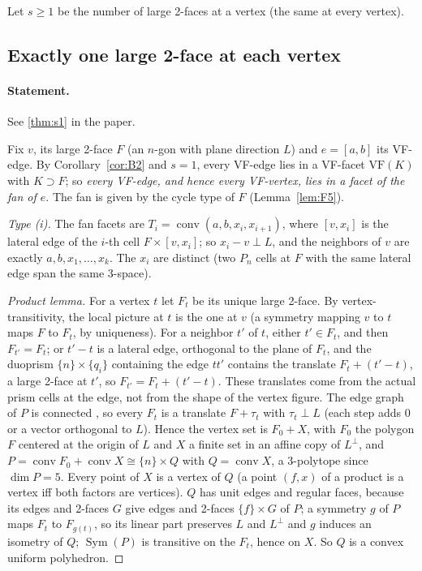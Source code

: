 \documentclass[11pt]{article}
\theoremstyle{definition}
\theoremstyle{remark}
\newcommand{\VF}{\mathrm{VF}}
\newcommand{\conv}{\operatorname{conv}}
\newcommand{\Sym}{\operatorname{Sym}}
\begin{document}
Let $s\ge1$ be the number of large 2-faces at a vertex (the same at every
vertex).

\subsection{Exactly one large 2-face at each vertex}\label{sec:s1}

\paragraph{Statement.} See \ref{thm:s1} in the paper.


Fix $v$, its large 2-face $F$ (an $n$-gon with plane direction $L$) and
$e=[a,b]$ its VF-edge. By Corollary~\ref{cor:B2} and $s=1$, every VF-edge
lies in a VF-facet $\VF(K)$ with $K\supset F$; so \emph{every VF-edge, and
hence every VF-vertex, lies in a facet of the fan of $e$}. The fan is
given by the cycle type of $F$ (Lemma~\ref{lem:F5}).

\begin{proof}[Type (i)]
The fan facets are $T_i=\conv(a,b,x_i,x_{i+1})$, where $[v,x_i]$ is the
lateral edge of the $i$-th cell $F\times[v,x_i]$; so $x_i-v\perp L$, and the
neighbors of $v$ are exactly $a,b,x_1,\dots,x_k$. The $x_i$ are distinct
(two $P_n$ cells at $F$ with the same lateral edge span the same 3-space).

\emph{Product lemma.} For a vertex $t$ let $F_t$ be its unique large
2-face. By vertex-transitivity, the local picture at $t$ is the one at
$v$ (a symmetry mapping $v$ to $t$ maps $F$ to $F_t$, by uniqueness). For a
neighbor $t'$ of $t$, either $t'\in F_t$, and then $F_{t'}=F_t$; or $t'-t$
is a lateral edge, orthogonal to the plane of $F_t$, and the duoprism
$\{n\}\times\{q_i\}$ containing the edge $tt'$ contains the translate
$F_t+(t'-t)$, a large 2-face at $t'$, so $F_{t'}=F_t+(t'-t)$. These
translates come from the actual prism cells at the edge, not from the
shape of the vertex figure. The edge graph of $P$ is connected
\cite{Balinski1961}, so every $F_t$ is a translate $F+\tau_t$ with
$\tau_t\perp L$ (each step adds $0$ or a vector orthogonal to $L$).
Hence the vertex set is $F_0+X$, with $F_0$ the polygon $F$ centered at the
origin of $L$ and $X$ a finite set in an affine copy of $L^\perp$, and
$P=\conv F_0+\conv X\cong\{n\}\times Q$ with $Q=\conv X$, a 3-polytope since
$\dim P=5$. Every point of $X$ is a vertex of $Q$ (a point $(f,x)$ of a
product is a vertex iff both factors are vertices). $Q$ has unit edges and
regular faces, because its edges and 2-faces $G$ give edges and 2-faces
$\{f\}\times G$ of $P$; a symmetry $g$ of $P$ maps $F_t$ to $F_{g(t)}$, so
its linear part preserves $L$ and $L^\perp$ and $g$ induces an isometry of
$Q$; $\Sym(P)$ is transitive on the $F_t$, hence on $X$. So $Q$ is a convex
uniform polyhedron.
\end{proof}
\end{document}
